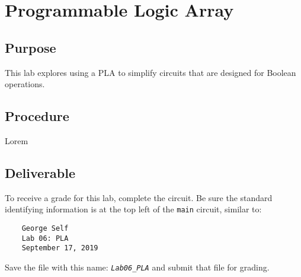 \chapter{Programmable Logic Array}\label{pla}

\section{Purpose}

This lab explores using a \ac{PLA} to simplify circuits that are designed for Boolean operations.

\section{Procedure}

Lorem

\section{Deliverable}

To receive a grade for this lab, complete the circuit. Be sure the standard identifying information is at the top left of the \lstinline{main} circuit, similar to: 

\bigskip
\begin{minipage}{\linewidth}
	\begin{verbatim}
	George Self
	Lab 06: PLA
	September 17, 2019
	\end{verbatim}
\end{minipage}
\bigskip

Save the file with this name: \emph{\texttt{Lab06\_PLA}} and submit that file for grading.

